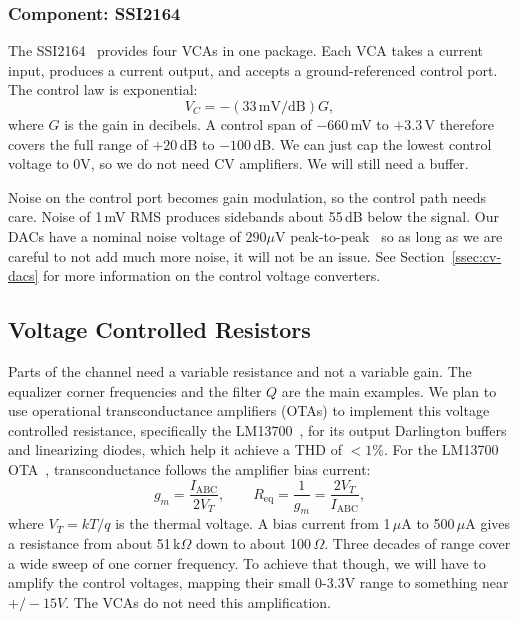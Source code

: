 \documentclass[11pt, letterpaper,titlepage]{article}
\begin{document}
\subsubsection*{Component: SSI2164}
The SSI2164~\cite{ssi2164} provides four VCAs in one package. Each VCA takes a current input,
produces a current output, and accepts a ground-referenced control port. The
control law is exponential:
%
\begin{equation}
    V_C = -\left(33\,\mathrm{mV/dB}\right) G ,
    \label{eq:vca-law}
\end{equation}
%
where $G$ is the gain in decibels. A control span of $-660$\,mV to $+3.3$\,V
therefore covers the full range of $+20$\,dB to $-100$\,dB. We can just cap the lowest control voltage to 0V, so we do not need CV amplifiers. We will still need a buffer.


Noise on the control port becomes gain modulation, so the control path needs
care. Noise of 1\,mV RMS produces sidebands about 55\,dB below the signal. Our DACs have a nominal noise voltage of $290\mu$V peak-to-peak~\cite{mcp4728} so as long as we are careful to not add much more noise, it will not be an issue. See Section~\ref{ssec:cv-dacs} for more information on the control voltage converters.

\subsection{Voltage Controlled Resistors}
\label{ssec:vcr-sec}

Parts of the channel need a variable resistance and not a variable gain. The
equalizer corner frequencies and the filter $Q$ are the main examples. We plan to use operational transconductance amplifiers (OTAs) to implement this voltage controlled resistance, specifically the LM13700~\cite{lm13700}, for its output Darlington buffers and linearizing diodes, which help it achieve a THD of $<1\%.$  For the
LM13700 OTA~\cite{lm13700}, transconductance follows the amplifier
bias current:
%
\begin{equation}
    g_m = \frac{I_\mathrm{ABC}}{2 V_T} ,
    \qquad
    R_\mathrm{eq} = \frac{1}{g_m} = \frac{2 V_T}{I_\mathrm{ABC}} ,
    \label{eq:ota-gm}
\end{equation}
%
where $V_T = kT/q$ is the thermal voltage. A bias current from 1\,$\mu$A to
500\,$\mu$A gives a resistance from about 51\,k$\Omega$ down to about
100\,$\Omega$. Three decades of range cover a wide sweep of one corner
frequency. To achieve that though, we will have to amplify the control voltages, mapping their small 0-3.3V range to something near $+/-15V$. The VCAs do not need this amplification.
\end{document}
